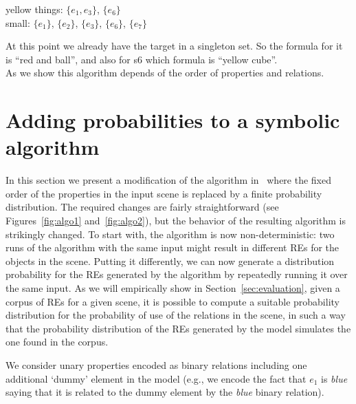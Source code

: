 yellow things: $\{e_1, e_3\}$, $\{e_6\}$ \\
small: $\{e_1\}$, $\{e_2\}$, $\{e_3\}$, $\{e_6\}$, $\{e_7\}$

At this point we already have the target in a singleton set. So the formula for it is ``red and ball'', and also for s6 which formula is ``yellow cube''.\\


As we show this algorithm depends of the order of properties and relations.\\


\section{Adding probabilities to a symbolic algorithm} \label{sec:algorithm}


In this section we present a modification of the algorithm in~\cite{arec2:2008:Areces} where the fixed order of the properties in the 
input scene is replaced by a finite probability distribution.  The required changes
are fairly straightforward (see Figures~\ref{fig:algo1} and~\ref{fig:algo2}), but 
the behavior of the resulting algorithm is strikingly changed. To start with, the 
algorithm is now non-deterministic: two runs of the algorithm with the same 
input might result in different REs for the objects in the scene.  Putting 
it differently, we can now generate a distribution probability for the REs generated by the algorithm by repeatedly running 
it over the same input.  As we will empirically show in Section~\ref{sec:evaluation}, given a 
corpus of REs for a given scene, it is possible to compute a suitable probability 
distribution for the probability of use of the relations in the scene, in such a way that the probability 
distribution of the REs generated by the model simulates the one found in the corpus.

We consider unary
properties encoded as binary relations including one additional `dummy' element in the model (e.g., we encode the fact that $e_1$ is \emph{blue} saying that it is related to the dummy element by the \emph{blue} binary relation).


